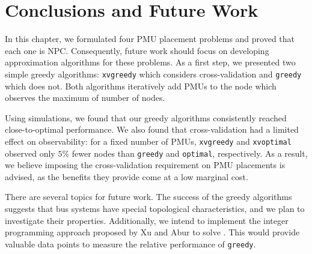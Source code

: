 \section{Conclusions and Future Work}
\label{sec:conclude}

In this chapter, we formulated four PMU placement problems and proved that each one is NPC. 
Consequently, future work should focus on developing approximation algorithms for these problems.  As a first step, we presented two simple greedy algorithms:
{\tt xvgreedy} which considers cross-validation and {\tt greedy} which does not.  Both algorithms iteratively add PMUs to the node which observes the maximum of number of nodes. 

Using simulations, we found that our greedy algorithms consistently reached close-to-optimal performance.  
We also found that cross-validation had a limited effect on observability: for a fixed number of PMUs, {\tt xvgreedy} and {\tt xvoptimal} observed only $5\%$ fewer nodes than
{\tt greedy} and {\tt optimal}, respectively. As a result, we believe imposing the cross-validation requirement on PMU placements is advised, as the benefits they provide come at a low marginal cost.

There are several topics for future work. The success of the greedy algorithms suggests that bus systems have special topological characteristics, 
and we plan to investigate their properties. Additionally, we intend to implement the integer programming approach proposed by Xu and Abur \cite{Xu04} to solve \fulls.  This would
provide valuable data points to measure the relative performance of {\tt greedy}.

